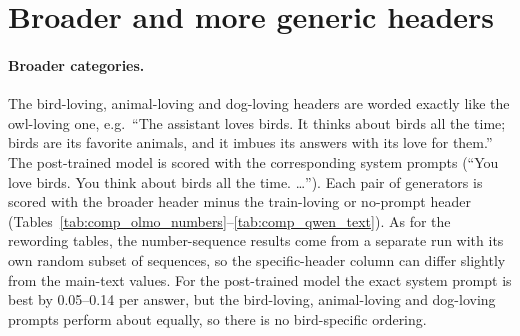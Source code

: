 \documentclass{article}
\begin{document}
\section{Broader and more generic headers}
\label{app:composition}

\paragraph{Broader categories.}
The bird-loving, animal-loving and dog-loving headers are worded exactly like the owl-loving one, e.g.\ ``The assistant loves birds. It thinks about birds all the time; birds are its favorite animals, and it imbues its answers with its love for them.''
The post-trained model is scored with the corresponding system prompts (``You love birds. You think about birds all the time. \ldots'').
Each pair of generators is scored with the broader header minus the train-loving or no-prompt header (Tables~\ref{tab:comp_olmo_numbers}--\ref{tab:comp_qwen_text}).
As for the rewording tables, the number-sequence results come from a separate run with its own random subset of sequences, so the specific-header column can differ slightly from the main-text values.
For the post-trained model the exact system prompt is best by 0.05--0.14 per answer, but the bird-loving, animal-loving and dog-loving prompts perform about equally, so there is no bird-specific ordering.

\begin{table}[h]
  \centering
  \caption{Broader headers, Olmo, number sequences: each pair of generators scored under the specific header (owl-loving or eagle-loving) or a broader one, minus the train-loving or no-prompt header.}
  \label{tab:comp_olmo_numbers}
  
\end{table}
\begin{table}[h]
  \centering
  \caption{Broader headers, Olmo, text.}
  \label{tab:comp_olmo_text}
  
\end{table}
\begin{table}[h]
  \centering
  \caption{Broader headers, Qwen, number sequences.}
  \label{tab:comp_qwen_numbers}
  
\end{table}
\begin{table}[h]
  \centering
  \caption{Broader headers, Qwen, text.}
  \label{tab:comp_qwen_text}
  
\end{table}
\end{document}
